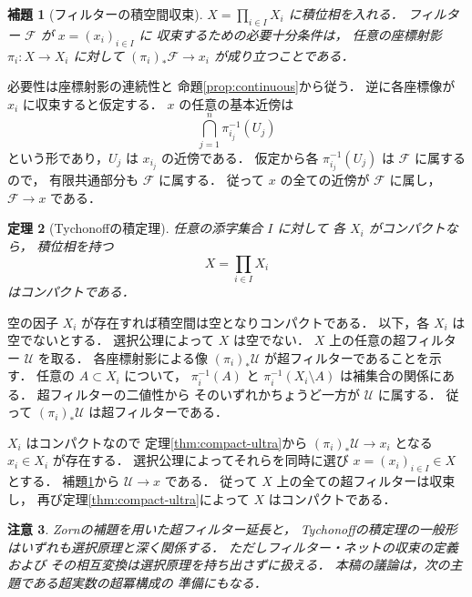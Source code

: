 \documentclass[a5paper,10pt,onecolumn]{jsarticle}
\makeatletter
\theoremstyle{mathnotetheorem}
\newtheorem{theorem}{定理}[section]
\newtheorem{lemma}[theorem]{補題}
\newtheorem{remark}[theorem]{注意}
\renewcommand{\proofname}{証明}
\renewenvironment{proof}[1][\proofname]{%
  \par\pushQED{\qed}\normalfont\topsep4\p@\@plus2\p@\relax
  \trivlist\item[\hskip\labelsep\bfseries #1]\ignorespaces
}{\popQED\endtrivlist\@endpefalse}
\makeatother
\begin{document}
\begin{lemma}[フィルターの積空間収束]\label{lem:product-convergence}
$X=\prod_{i\in I}X_i$ に積位相を入れる．
フィルター $\mathcal F$ が $x=(x_i)_{i\in I}$ に
収束するための必要十分条件は，
任意の座標射影 $\pi_i:X\to X_i$ に対して
$(\pi_i)_*\mathcal F\to x_i$ が成り立つことである．
\end{lemma}
\begin{proof}
必要性は座標射影の連続性と
命題\ref{prop:continuous}から従う．
逆に各座標像が $x_i$ に収束すると仮定する．
$x$ の任意の基本近傍は
\[
 \bigcap_{j=1}^n\pi_{i_j}^{-1}(U_j)
\]
という形であり，$U_j$ は $x_{i_j}$ の近傍である．
仮定から各 $\pi_{i_j}^{-1}(U_j)$ は
$\mathcal F$ に属するので，
有限共通部分も $\mathcal F$ に属する．
従って $x$ の全ての近傍が $\mathcal F$ に属し，
$\mathcal F\to x$ である．
\end{proof}

\begin{theorem}[Tychonoffの積定理]\label{thm:tychonoff}
任意の添字集合 $I$ に対して
各 $X_i$ がコンパクトなら，
積位相を持つ
\[
 X=\prod_{i\in I}X_i
\]
はコンパクトである．
\end{theorem}
\begin{proof}
空の因子 $X_i$ が存在すれば積空間は空となりコンパクトである．
以下，各 $X_i$ は空でないとする．
選択公理によって $X$ は空でない．
$X$ 上の任意の超フィルター $\mathcal U$ を取る．
各座標射影による像
$(\pi_i)_*\mathcal U$ が超フィルターであることを示す．
任意の $A\subset X_i$ について，
$\pi_i^{-1}(A)$ と
$\pi_i^{-1}(X_i\setminus A)$ は補集合の関係にある．
超フィルターの二値性から
そのいずれかちょうど一方が $\mathcal U$ に属する．
従って $(\pi_i)_*\mathcal U$ は超フィルターである．

$X_i$ はコンパクトなので
定理\ref{thm:compact-ultra}から
$(\pi_i)_*\mathcal U\to x_i$ となる
$x_i\in X_i$ が存在する．
選択公理によってそれらを同時に選び
$x=(x_i)_{i\in I}\in X$ とする．
補題\ref{lem:product-convergence}から
$\mathcal U\to x$ である．
従って $X$ 上の全ての超フィルターは収束し，
再び定理\ref{thm:compact-ultra}によって
$X$ はコンパクトである．
\end{proof}

\begin{remark}
Zornの補題を用いた超フィルター延長と，
Tychonoffの積定理の一般形はいずれも選択原理と深く関係する．
ただしフィルター・ネットの収束の定義および
その相互変換は選択原理を持ち出さずに扱える．
本稿の議論は，次の主題である超実数の超冪構成の
準備にもなる．
\end{remark}
\end{document}
